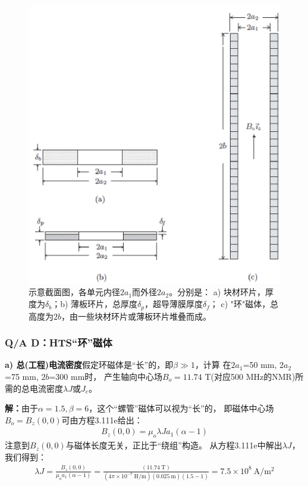 \begin{figure}
	\centering
	\includegraphics[scale=0.5]{chpt9/figs/fig9.16.eps}
	\caption{示意截面图，各单元内径$2a_1$而外径$2a_2$。分别是：
		a) 块材环片，厚度为$\delta_b$；b) 薄板环片，总厚度$\delta_p$，超导薄膜厚度$\delta_f$；
		c) "环"磁体，总高度为$2b$，由一些块材环片或薄板环片堆叠而成。}
\end{figure}

\subsubsection{Q/A D：HTS“环”磁体}
\textbf{a) 总(工程)电流密度}\qquad 假定环磁体是“长”的，即$\beta\gg 1$，计算
在$2a_1$=50 mm, $2a_2$=75 mm, $2b$=300 mm时，
产生轴向中心场$B_o=11.74$ T(对应500 MHz的NMR)所需的总电流密度$\lambda J$或$J_e$。

\textbf{解：}由于$\alpha=1.5,\beta=6$，这个“螺管”磁体可以视为“长”的，
即磁体中心场$B_o=B_z(0,0)$可由方程3.111e给出：
\begin{align*}%
B_z(0,0)=\mu_o\lambda Ja_1(\alpha-1) \tag{3.111e}
\end{align*}
注意到$B_z(0,0)$与磁体长度无关，正比于“绕组”构造。
从方程3.111e中解出$\lambda J$，我们得到：
\begin{align*}%
\lambda J=\frac{B_z(0,0)}{\mu_oa_1(\alpha-1)}=\frac{(11.74\ \mathrm{T})}{(4\pi\times 10^{-7}\ \mathrm{H/m})(0.025\ \mathrm{m})(1.5-1)}=7.5\times 10^8\ \mathrm{A/m^2}
\end{align*}

